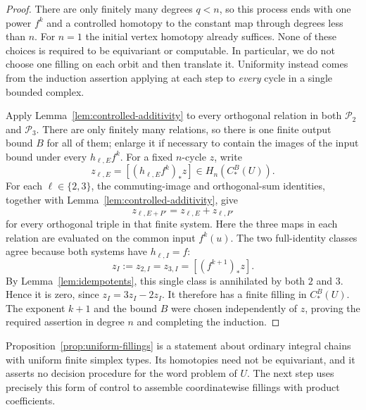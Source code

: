 \begin{proof}
There are only finitely many degrees $q<n$, so this process ends
with one power $f^k$ and a controlled homotopy to the constant map
through degrees less than $n$.  For $n=1$ the initial vertex
homotopy already suffices.  None of these choices is required to be
equivariant or computable.  In particular, we do not choose one
filling on each orbit and then translate it.  Uniformity instead
comes from the induction assertion applying at each step to
\emph{every} cycle in a single bounded complex.

Apply Lemma~\ref{lem:controlled-additivity} to every orthogonal
relation in both $\mathcal P_2$ and $\mathcal P_3$.  There are only
finitely many relations, so there is one finite output bound $B$
for all of them; enlarge it if necessary to contain the images of
the input bound under every $h_{\ell,E}f^k$.  For a fixed $n$-cycle $z$,
write
\[
 z_{\ell,E}=[(h_{\ell,E}f^k)_*z]\in H_n(C_*^B(U)).
\]
For each $\ell\in\{2,3\}$, the commuting-image and orthogonal-sum identities,
together with Lemma~\ref{lem:controlled-additivity}, give
\[
 z_{\ell,E+P'}=z_{\ell,E}+z_{\ell,P'}
\]
for every orthogonal triple in that finite system.  Here the three maps
in each relation are evaluated on the common input $f^k(u)$.  The two
full-identity classes agree because both systems have $h_{\ell,I}=f$:
\[
 z_I:=z_{2,I}=z_{3,I}=[(f^{k+1})_*z].
\]
By Lemma~\ref{lem:idempotents}, this single class is annihilated by
both $2$ and $3$.  Hence it is zero, since $z_I=3z_I-2z_I$.
It therefore has a finite filling in $C_*^B(U)$.  The exponent
$k+1$ and the bound $B$ were chosen independently of $z$, proving
the required assertion in degree $n$ and completing the induction.
\end{proof}

Proposition~\ref{prop:uniform-fillings} is a statement about ordinary
integral chains with uniform finite simplex types.  Its homotopies
need not be equivariant, and it asserts no decision procedure for
the word problem of $U$.  The next step uses precisely this form of
control to assemble coordinatewise fillings with product
coefficients.
